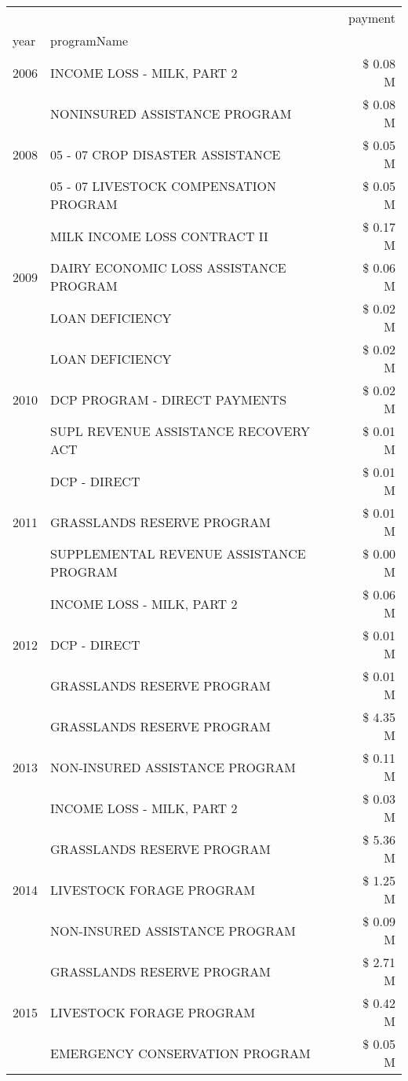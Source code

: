 \begin{tabular}{llr}
\toprule
 &  & payment \\
year & programName &  \\
\midrule
2006 & INCOME LOSS - MILK, PART 2 & \$ 0.08 M \\
\cline{1-3}
\multirow[t]{3}{*}{2008} & NONINSURED ASSISTANCE PROGRAM & \$ 0.08 M \\
 & 05 - 07 CROP DISASTER ASSISTANCE & \$ 0.05 M \\
 & 05 - 07 LIVESTOCK COMPENSATION PROGRAM & \$ 0.05 M \\
\cline{1-3}
\multirow[t]{3}{*}{2009} & MILK INCOME LOSS CONTRACT II & \$ 0.17 M \\
 & DAIRY ECONOMIC LOSS ASSISTANCE PROGRAM & \$ 0.06 M \\
 & LOAN DEFICIENCY & \$ 0.02 M \\
\cline{1-3}
\multirow[t]{3}{*}{2010} & LOAN DEFICIENCY & \$ 0.02 M \\
 & DCP PROGRAM - DIRECT PAYMENTS & \$ 0.02 M \\
 & SUPL REVENUE ASSISTANCE RECOVERY ACT & \$ 0.01 M \\
\cline{1-3}
\multirow[t]{3}{*}{2011} & DCP - DIRECT & \$ 0.01 M \\
 & GRASSLANDS RESERVE PROGRAM & \$ 0.01 M \\
 & SUPPLEMENTAL REVENUE ASSISTANCE PROGRAM & \$ 0.00 M \\
\cline{1-3}
\multirow[t]{3}{*}{2012} & INCOME LOSS - MILK, PART 2 & \$ 0.06 M \\
 & DCP - DIRECT & \$ 0.01 M \\
 & GRASSLANDS RESERVE PROGRAM & \$ 0.01 M \\
\cline{1-3}
\multirow[t]{3}{*}{2013} & GRASSLANDS RESERVE PROGRAM & \$ 4.35 M \\
 & NON-INSURED ASSISTANCE PROGRAM & \$ 0.11 M \\
 & INCOME LOSS - MILK, PART 2 & \$ 0.03 M \\
\cline{1-3}
\multirow[t]{3}{*}{2014} & GRASSLANDS RESERVE PROGRAM & \$ 5.36 M \\
 & LIVESTOCK FORAGE PROGRAM & \$ 1.25 M \\
 & NON-INSURED ASSISTANCE PROGRAM & \$ 0.09 M \\
\cline{1-3}
\multirow[t]{3}{*}{2015} & GRASSLANDS RESERVE PROGRAM & \$ 2.71 M \\
 & LIVESTOCK FORAGE PROGRAM & \$ 0.42 M \\
 & EMERGENCY CONSERVATION PROGRAM & \$ 0.05 M \\

\end{tabular}
